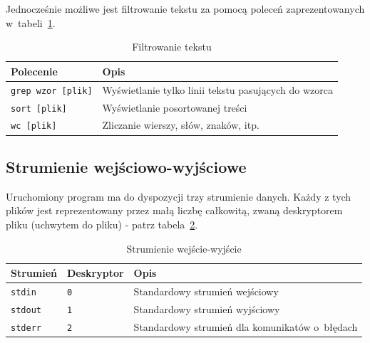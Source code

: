 Jednocześnie możliwe jest filtrowanie tekstu za pomocą poleceń zaprezentowanych w~tabeli~\ref{tab:filtruj}.

\begin{table}[h!]
\centering
\caption{Filtrowanie tekstu}
\setlength{\arrayrulewidth}{1pt}
\setlength{\tabcolsep}{6pt}
\renewcommand{\arraystretch}{1.2}
\begin{tabular}{ |p{}|p{}|}
\hline \rowcolor{gray}
\textbf{Polecenie} & \textbf{Opis} \\ \hline
\mbox{\lstinline[style=MyBashStyle]{grep wzor [plik]}} & Wyświetlanie tylko linii tekstu pasujących do wzorca \\ \hline
\mbox{\lstinline[style=MyBashStyle]{sort [plik]}} & Wyświetlanie posortowanej treści \\ \hline
\mbox{\lstinline[style=MyBashStyle]{wc [plik]}} & Zliczanie wierszy, słów, znaków, itp. \\ \hline
\end{tabular}
\label{tab:filtruj}
\end{table}

\subsection{Strumienie wejściowo-wyjściowe}

Uruchomiony program ma do dyspozycji trzy strumienie danych. Każdy z tych plików jest reprezentowany przez małą liczbę całkowitą, zwaną deskryptorem pliku (uchwytem do pliku) - patrz tabela~\ref{tab:strumienie}.

\begin{table}[h!]
\centering
\caption{Strumienie wejście-wyjście}
\setlength{\arrayrulewidth}{1pt}
\setlength{\tabcolsep}{6pt}
\renewcommand{\arraystretch}{1.2}
\begin{tabular}{ |p{}|p{}|p{}|}
\hline \rowcolor{gray}
\textbf{Strumień} & \textbf{Deskryptor} & \textbf{Opis} \\ \hline
\mbox{\lstinline[style=MyBashStyle]{stdin}} & \mbox{\lstinline[style=MyBashStyle]{0}} &  Standardowy strumień wejściowy  \\ \hline
\mbox{\lstinline[style=MyBashStyle]{stdout}} & \mbox{\lstinline[style=MyBashStyle]{1}} &  Standardowy strumień wyjściowy  \\ \hline
\mbox{\lstinline[style=MyBashStyle]{stderr}} & \mbox{\lstinline[style=MyBashStyle]{2}} &  Standardowy strumień dla komunikatów o~błędach  \\ \hline
\end{tabular}
\label{tab:strumienie}
\end{table}

